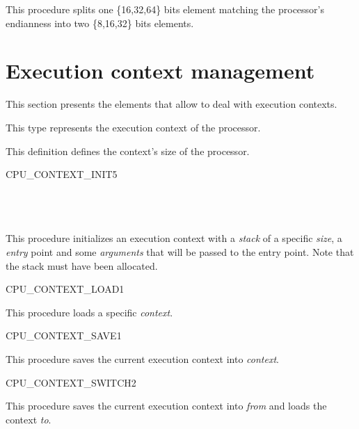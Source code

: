 This procedure splits one \{16,32,64\} bits element matching the processor's
endianness into two \{8,16,32\} bits elements.

\skipoff
\section {Execution context management}
This section presents the elements that allow to deal with execution
contexts.
\skipon


This type represents the execution context of the processor.


This definition defines the context's size of the processor.

\begin{procedure}{CPU\_CONTEXT\_INIT}{5}
	\\
	\\
	\\
	\\
\end{procedure}

This procedure initializes an execution context with a \emph{stack}
of a specific \emph{size}, a \emph{entry} point and some
\emph{arguments} that will be passed to the entry point. Note that
the stack must have been allocated.

\begin{procedure}{CPU\_CONTEXT\_LOAD}{1}
\end {procedure}

This procedure loads a specific \emph{context}.

\begin{procedure}{CPU\_CONTEXT\_SAVE}{1}
\end {procedure}

This procedure saves the current execution context into \emph{context}.

\begin{procedure}{CPU\_CONTEXT\_SWITCH}{2}
	\\
\end {procedure}

This procedure saves the current execution context into \emph{from}
and loads the context \emph{to}.

